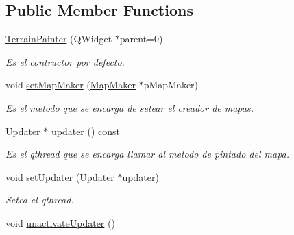 \subsection*{Public Member Functions}
\begin{DoxyCompactItemize}
\item 
\hyperlink{class_terrain_painter_a47946a56086bd611200820eb77ca3147}{Terrain\-Painter} (Q\-Widget $\ast$parent=0)
\begin{DoxyCompactList}\small\item\em Es el contructor por defecto. \end{DoxyCompactList}\item 
void \hyperlink{class_terrain_painter_a13d85e3171b965bd6e8f36fe1202e1c6}{set\-Map\-Maker} (\hyperlink{class_map_maker}{Map\-Maker} $\ast$p\-Map\-Maker)
\begin{DoxyCompactList}\small\item\em Es el metodo que se encarga de setear el creador de mapas. \end{DoxyCompactList}\item 
\hyperlink{class_updater}{Updater} $\ast$ \hyperlink{class_terrain_painter_a380f07447ee0f57907853d8e076d2b13}{updater} () const 
\begin{DoxyCompactList}\small\item\em Es el qthread que se encarga llamar al metodo de pintado del mapa. \end{DoxyCompactList}\item 
void \hyperlink{class_terrain_painter_adb52ca609c562dcfdfee84e844f7a32a}{set\-Updater} (\hyperlink{class_updater}{Updater} $\ast$\hyperlink{class_terrain_painter_a380f07447ee0f57907853d8e076d2b13}{updater})
\begin{DoxyCompactList}\small\item\em Setea el qthread. \end{DoxyCompactList}\item 
\hypertarget{class_terrain_painter_adb9dab4b8fe180bab8a722d7223a1048}{void \hyperlink{class_terrain_painter_adb9dab4b8fe180bab8a722d7223a1048}{unactivate\-Updater} ()}\label{class_terrain_painter_adb9dab4b8fe180bab8a722d7223a1048}


\end{DoxyCompactItemize}
